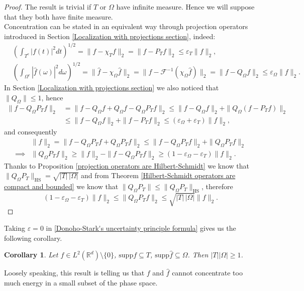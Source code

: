 \documentclass[corpo=11pt, stile=classica, tipotesi=custom,
greek, evenboxes, english]{toptesi}
\numberwithin{equation}{chapter}
\newtheorem{cor}[teo]{Corollary}
\theoremstyle{definition}
\theoremstyle{remark}
\newcommand{\R}{\mathbb{R}} %
\newcommand{\F}{\mathscr{F}} %
\begin{document}
\begin{proof}
	The result is trivial if $T$ or $\Omega$ have infinite measure. Hence we will suppose that they both have finite measure.\\
	Concentration can be stated in an equivalent way through projection operators introduced in Section \ref{Localization with projections section}, indeed:
	\begin{align*}
		&\left( \int_{T^c} |f(t)|^2 dt\right)^{1/2} = \|f - \chi_T f\|_2  = \|f - P_T f\|_2 \leq \varepsilon_{T} \|f\|_2,\\
		&\left( \int_{\Omega^c} |\hat{f}(\omega)|^2 d\omega\right)^{1/2} = \|\hat{f} - \chi_{\Omega} \hat{f} \|_2 = \|f - \F^{-1} (\chi_{\Omega} \hat{f}) \|_2 = \|f - Q_{\Omega}f \|_2 \leq \varepsilon_{\Omega} \|f\|_2.
	\end{align*}
	In Section \ref{Localization with projections section} we also noticed that $\|Q_{\Omega}\| \leq 1$, hence
	\begin{align*}
		\|f - Q_{\Omega}P_Tf \|_2 &= \|f - Q_{\Omega}f + Q_{\Omega}f - Q_{\Omega}P_T f \|_2 \leq \|f-Q_{\Omega}f \|_2 + \|Q_{\Omega}(f - P_T f) \|_2 \\
								  &\leq \|f-Q_{\Omega}f \|_2 + \|f - P_T f \|_2 \leq (\varepsilon_{\Omega} + \varepsilon_T)\|f\|_2,
	\end{align*}
	and consequently
	\begin{align*}
		&\|f\|_2 = \|f - Q_{\Omega}P_T f + Q_{\Omega}P_T f \|_2 \leq \|f - Q_{\Omega}P_T f\|_2 + \| Q_{\Omega}P_T f  \|_2\\
		\implies &\|Q_{\Omega}P_T f \|_2 \geq \|f\|_2 - \|f - Q_{\Omega}P_T f\|_2 \geq (1-\varepsilon_{\Omega} - \varepsilon_T)\|f\|_2.
	\end{align*}
	Thanks to Proposition \ref{projection operators are Hilbert-Schmidt} we know that $\| Q_{\Omega}P_T\|_{\mathrm{HS}} = \sqrt{|T| \, |\Omega|}$ and from Theorem \ref{Hilbert-Schmidt operators are compact and bounded} we know that $\|Q_{\Omega}P_T\| \leq \| Q_{\Omega}P_T\|_{\mathrm{HS}}$, therefore
	\begin{equation*}
		(1-\varepsilon_{\Omega} - \varepsilon_T)\|f\|_2 \leq \|Q_{\Omega}P_T f \|_2 \leq \sqrt{|T| \, |\Omega|} \|f\|_2.
	\end{equation*}
\end{proof}
Taking $\varepsilon = 0$ in \eqref{Donoho-Stark's uncertainty principle formula} gives us the following corollary.
\begin{cor}
	Let $f \in L^2(\R^d) \setminus \{0\}$, $\mathrm{supp}f \subseteq T$, $\mathrm{supp}\hat{f} \subseteq \Omega$. Then $|T| |\Omega| \geq 1$.
\end{cor}
Loosely speaking, this result is telling us that $f$ and $\hat{f}$ cannot concentrate too much energy in a small subset of the phase space.
\end{document}
